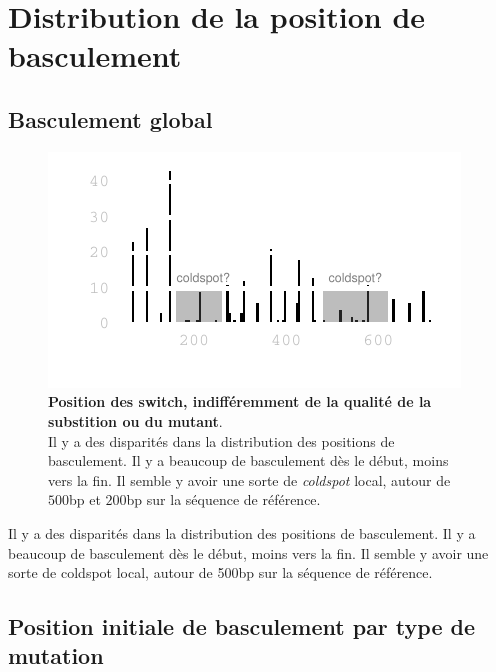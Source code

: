 \documentclass[a4paper]{tufte-handout}
\begin{document}
\clearpage
\section{Distribution de la position de basculement}
\label{sec:orgheadline11}
\subsection{Basculement global}
\label{sec:orgheadline9}
\begin{figure}
  \centering
  \includegraphics[width=\linewidth]{../switch_position_globale.pdf}
  \caption{\textbf{Position des switch, indifféremment de la qualité de la
      substition ou du mutant}. \\
    Il y a des disparités dans la distribution des positions de basculement. Il
    y a beaucoup de basculement dès le début, moins vers la fin. Il semble y
    avoir une sorte de \emph{coldspot} local, autour de $500$bp et $200$bp sur
    la séquence de référence. }
\end{figure}
Il y a des disparités dans la distribution des positions de basculement. Il y a
beaucoup de basculement dès le début, moins vers la fin. Il semble y avoir une
sorte de coldspot local, autour de 500bp sur la séquence de référence. 

\subsection{Position initiale de basculement par type de mutation}
\label{sec:orgheadline10}
\end{document}
